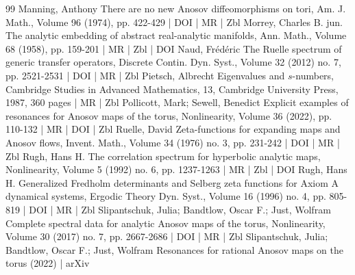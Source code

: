 \begin{thebibliography}{99}
 Manning, Anthony There are no new Anosov diffeomorphisms on tori, Am. J. Math., Volume 96 (1974), pp. 422-429 | DOI | MR | Zbl
 Morrey, Charles B. jun. The analytic embedding of abstract real-analytic manifolds, Ann. Math., Volume 68 (1958), pp. 159-201 | MR | Zbl | DOI
 Naud, Frédéric The Ruelle spectrum of generic transfer operators, Discrete Contin. Dyn. Syst., Volume 32 (2012) no. 7, pp. 2521-2531 | DOI | MR | Zbl
 Pietsch, Albrecht Eigenvalues and $s$-numbers, Cambridge Studies in Advanced Mathematics, 13, Cambridge University Press, 1987, 360 pages | MR | Zbl
 Pollicott, Mark; Sewell, Benedict Explicit examples of resonances for Anosov maps of the torus, Nonlinearity, Volume 36 (2022), pp. 110-132 | MR | DOI | Zbl
 Ruelle, David Zeta-functions for expanding maps and Anosov flows, Invent. Math., Volume 34 (1976) no. 3, pp. 231-242 | DOI | MR | Zbl
 Rugh, Hans H. The correlation spectrum for hyperbolic analytic maps, Nonlinearity, Volume 5 (1992) no. 6, pp. 1237-1263 | MR | Zbl | DOI
 Rugh, Hans H. Generalized Fredholm determinants and Selberg zeta functions for Axiom A dynamical systems, Ergodic Theory Dyn. Syst., Volume 16 (1996) no. 4, pp. 805-819 | DOI | MR | Zbl
 Slipantschuk, Julia; Bandtlow, Oscar F.; Just, Wolfram Complete spectral data for analytic Anosov maps of the torus, Nonlinearity, Volume 30 (2017) no. 7, pp. 2667-2686 | DOI | MR | Zbl
 Slipantschuk, Julia; Bandtlow, Oscar F.; Just, Wolfram Resonances for rational Anosov maps on the torus (2022) | arXiv
\end{thebibliography}
